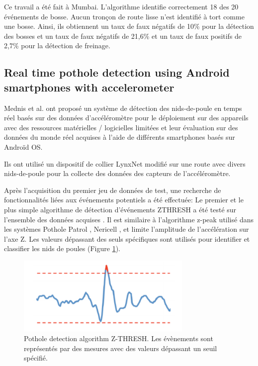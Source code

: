 Ce travail a été fait à Mumbai. L'algorithme identifie correctement 18 des 20 événements de bosse. Aucun tronçon de route lisse n'est identifié à tort comme une bosse. Ainsi, ils obtiennent un taux de faux négatifs de 10\% pour la détection des bosses et un taux de faux négatifs de 21,6\% et un taux de faux positifs de 2,7\% pour la détection de freinage.

\subsection{Real time pothole detection using Android smartphones with accelerometer}
Mednis et al. ont proposé un système de détection des nids-de-poule en temps réel basés sur des données d'accéléromètre pour le déploiement sur des appareils avec des ressources matérielles / logicielles limitées et leur évaluation sur des données du monde réel acquises à l'aide de différents smartphones basés sur Androïd OS.

Ils ont utilisé un dispositif de collier LynxNet modifié \cite{zviedrisLynxNetWildAnimal2010} sur une route avec divers nids-de-poule pour la collecte des données des capteurs de l'accéléromètre.

Après l'acquisition du premier jeu de données de test, une recherche de fonctionnalités liées aux événements potentiels a été effectuée: Le premier et le plus simple algorithme de détection d'événements ZTHRESH a été testé sur l'ensemble des données acquises . Il est similaire à l'algorithme z-peak utilisé dans les systèmes Pothole Patrol \cite{PotholePatrolProceedings}, Nericell \cite{mohanNericellUsingMobile2008}, et limite l'amplitude de l'accélération sur l'axe Z. Les valeurs dépassant des seuls spécifiques sont utilisés pour identifier et classifier les nids de poules (Figure \ref{fig:graph_Z_THRESH}). 

\begin{figure}[h!]
  \center
  \includegraphics[width=0.75\textwidth]{Images/chapter2/relatedWork3.PNG}
  \caption{Pothole detection algorithm Z-THRESH. Les évènements sont représentés par des mesures avec des valeurs dépassant un seuil spécifié.}
  \label{fig:graph_Z_THRESH}
\end{figure}

